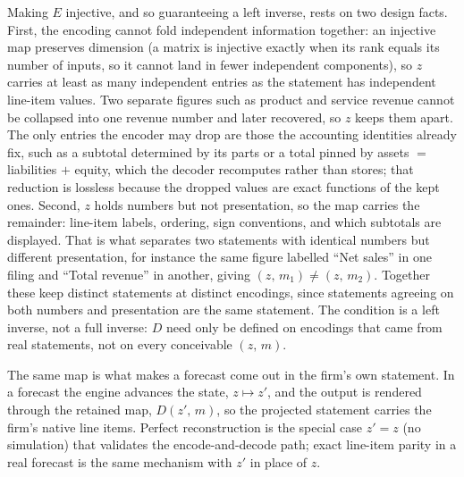 \documentclass[11pt]{article}
\begin{document}
Making $E$ injective, and so guaranteeing a left inverse, rests on two design facts. First, the encoding cannot fold independent information together: an injective map preserves dimension (a matrix is injective exactly when its rank equals its number of inputs, so it cannot land in fewer independent components), so $z$ carries at least as many independent entries as the statement has independent line-item values. Two separate figures such as product and service revenue cannot be collapsed into one revenue number and later recovered, so $z$ keeps them apart. The only entries the encoder may drop are those the accounting identities already fix, such as a subtotal determined by its parts or a total pinned by assets $=$ liabilities $+$ equity, which the decoder recomputes rather than stores; that reduction is lossless because the dropped values are exact functions of the kept ones. Second, $z$ holds numbers but not presentation, so the map carries the remainder: line-item labels, ordering, sign conventions, and which subtotals are displayed. That is what separates two statements with identical numbers but different presentation, for instance the same figure labelled ``Net sales'' in one filing and ``Total revenue'' in another, giving $(z,\, m_1) \neq (z,\, m_2)$. Together these keep distinct statements at distinct encodings, since statements agreeing on both numbers and presentation are the same statement. The condition is a left inverse, not a full inverse: $D$ need only be defined on encodings that came from real statements, not on every conceivable $(z,\, m)$.

The same map is what makes a forecast come out in the firm's own statement. In a forecast the engine advances the state, $z \mapsto z'$, and the output is rendered through the retained map, $D(z',\, m)$, so the projected statement carries the firm's native line items. Perfect reconstruction is the special case $z' = z$ (no simulation) that validates the encode-and-decode path; exact line-item parity in a real forecast is the same mechanism with $z'$ in place of $z$.
\end{document}

